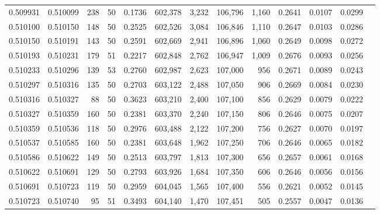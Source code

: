 \begin{tabular}{rrrrrrrrrrrrr}
0.509931 & 0.510099 & 238 &  50 &                                     0.1736 & 602,378 &   3,232 & 106,796 &   1,160 & 0.2641 & 0.0107 & 0.0299 \\
0.510100 & 0.510150 & 148 &  50 &                                     0.2525 & 602,526 &   3,084 & 106,846 &   1,110 & 0.2647 & 0.0103 & 0.0286 \\
0.510150 & 0.510191 & 143 &  50 &                                     0.2591 & 602,669 &   2,941 & 106,896 &   1,060 & 0.2649 & 0.0098 & 0.0272 \\
0.510193 & 0.510231 & 179 &  51 &                                     0.2217 & 602,848 &   2,762 & 106,947 &   1,009 & 0.2676 & 0.0093 & 0.0256 \\
0.510233 & 0.510296 & 139 &  53 &                                     0.2760 & 602,987 &   2,623 & 107,000 &     956 & 0.2671 & 0.0089 & 0.0243 \\
0.510297 & 0.510316 & 135 &  50 &                                     0.2703 & 603,122 &   2,488 & 107,050 &     906 & 0.2669 & 0.0084 & 0.0230 \\
0.510316 & 0.510327 &  88 &  50 &                                     0.3623 & 603,210 &   2,400 & 107,100 &     856 & 0.2629 & 0.0079 & 0.0222 \\
0.510327 & 0.510359 & 160 &  50 &                                     0.2381 & 603,370 &   2,240 & 107,150 &     806 & 0.2646 & 0.0075 & 0.0207 \\
0.510359 & 0.510536 & 118 &  50 &                                     0.2976 & 603,488 &   2,122 & 107,200 &     756 & 0.2627 & 0.0070 & 0.0197 \\
0.510537 & 0.510585 & 160 &  50 &                                     0.2381 & 603,648 &   1,962 & 107,250 &     706 & 0.2646 & 0.0065 & 0.0182 \\
0.510586 & 0.510622 & 149 &  50 &                                     0.2513 & 603,797 &   1,813 & 107,300 &     656 & 0.2657 & 0.0061 & 0.0168 \\
0.510622 & 0.510691 & 129 &  50 &                                     0.2793 & 603,926 &   1,684 & 107,350 &     606 & 0.2646 & 0.0056 & 0.0156 \\
0.510691 & 0.510723 & 119 &  50 &                                     0.2959 & 604,045 &   1,565 & 107,400 &     556 & 0.2621 & 0.0052 & 0.0145 \\
0.510723 & 0.510740 &  95 &  51 &                                     0.3493 & 604,140 &   1,470 & 107,451 &     505 & 0.2557 & 0.0047 & 0.0136 \\

\end{tabular}
